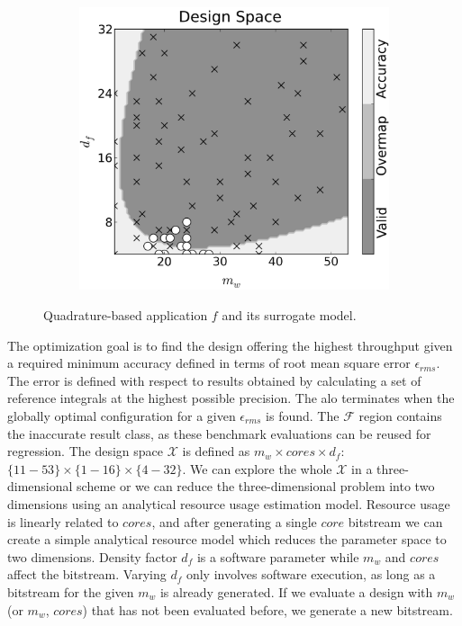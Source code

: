 \documentclass[runningheads,a4paper]{llncs}
\begin{document}
\begin{figure}
\begin{subfigure}[b]{0.31\textwidth}
        \end{subfigure}
        \begin{subfigure}[b]{0.31\textwidth}
                \centering
                \includegraphics[width=\textwidth]{./figs/svm020_65_anson.png}
        \end{subfigure}
        \caption{Quadrature-based application $f$ and its surrogate model.}\label{fig:anson}
\end{figure}


The optimization goal is to find the design offering the highest throughput given a required minimum accuracy defined in terms of root mean square error $\epsilon_{rms}$. The error is defined with respect to results obtained by calculating a set of reference integrals at the highest possible precision. The \ac{alo} terminates when the globally optimal configuration for a given $\epsilon_{rms}$ is found. The $\mathcal{F}$ region contains the inaccurate result class, as these benchmark evaluations can be reused for regression. The design space $\mathcal{X}$ is defined as $m_w \times cores \times d_f $: $\{11-53\} \times \{1-16\} \times \{4-32\}$. We can explore the whole $\mathcal{X}$ in a three-dimensional scheme or we can reduce the three-dimensional problem into two dimensions using an analytical resource usage estimation model. Resource usage is linearly related to $cores$, and after generating a single $core$ bitstream we can create a simple analytical resource model which reduces the parameter space to two dimensions. Density factor $d_{f}$ is a software parameter while $m_w$ and $cores$ affect the bitstream. Varying $d_f$ only involves software execution, as long as a bitstream for the given $m_w$ is already generated. If we evaluate a design with $m_w$ (or $m_w$, $cores$) that has not been evaluated before, we generate a new bitstream.
\end{document}
